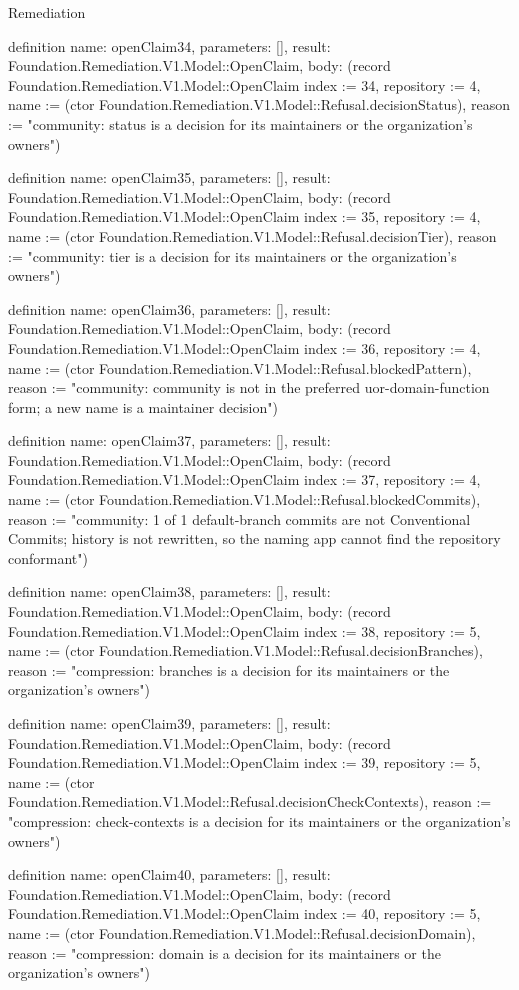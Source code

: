 \begin{lexlean}{Remediation}
\begin{semanticmodule}
definition{
  name: openClaim34,
  parameters: [],
  result: Foundation.Remediation.V1.Model::OpenClaim,
  body: (record Foundation.Remediation.V1.Model::OpenClaim {index := 34, repository := 4, name := (ctor Foundation.Remediation.V1.Model::Refusal.decisionStatus), reason := "community: status is a decision for its maintainers or the organization's owners"})
}

definition{
  name: openClaim35,
  parameters: [],
  result: Foundation.Remediation.V1.Model::OpenClaim,
  body: (record Foundation.Remediation.V1.Model::OpenClaim {index := 35, repository := 4, name := (ctor Foundation.Remediation.V1.Model::Refusal.decisionTier), reason := "community: tier is a decision for its maintainers or the organization's owners"})
}

definition{
  name: openClaim36,
  parameters: [],
  result: Foundation.Remediation.V1.Model::OpenClaim,
  body: (record Foundation.Remediation.V1.Model::OpenClaim {index := 36, repository := 4, name := (ctor Foundation.Remediation.V1.Model::Refusal.blockedPattern), reason := "community: community is not in the preferred uor-{domain}-{function} form; a new name is a maintainer decision"})
}

definition{
  name: openClaim37,
  parameters: [],
  result: Foundation.Remediation.V1.Model::OpenClaim,
  body: (record Foundation.Remediation.V1.Model::OpenClaim {index := 37, repository := 4, name := (ctor Foundation.Remediation.V1.Model::Refusal.blockedCommits), reason := "community: 1 of 1 default-branch commits are not Conventional Commits; history is not rewritten, so the naming app cannot find the repository conformant"})
}

definition{
  name: openClaim38,
  parameters: [],
  result: Foundation.Remediation.V1.Model::OpenClaim,
  body: (record Foundation.Remediation.V1.Model::OpenClaim {index := 38, repository := 5, name := (ctor Foundation.Remediation.V1.Model::Refusal.decisionBranches), reason := "compression: branches is a decision for its maintainers or the organization's owners"})
}

definition{
  name: openClaim39,
  parameters: [],
  result: Foundation.Remediation.V1.Model::OpenClaim,
  body: (record Foundation.Remediation.V1.Model::OpenClaim {index := 39, repository := 5, name := (ctor Foundation.Remediation.V1.Model::Refusal.decisionCheckContexts), reason := "compression: check-contexts is a decision for its maintainers or the organization's owners"})
}

definition{
  name: openClaim40,
  parameters: [],
  result: Foundation.Remediation.V1.Model::OpenClaim,
  body: (record Foundation.Remediation.V1.Model::OpenClaim {index := 40, repository := 5, name := (ctor Foundation.Remediation.V1.Model::Refusal.decisionDomain), reason := "compression: domain is a decision for its maintainers or the organization's owners"})
}


\end{semanticmodule}
\end{lexlean}
